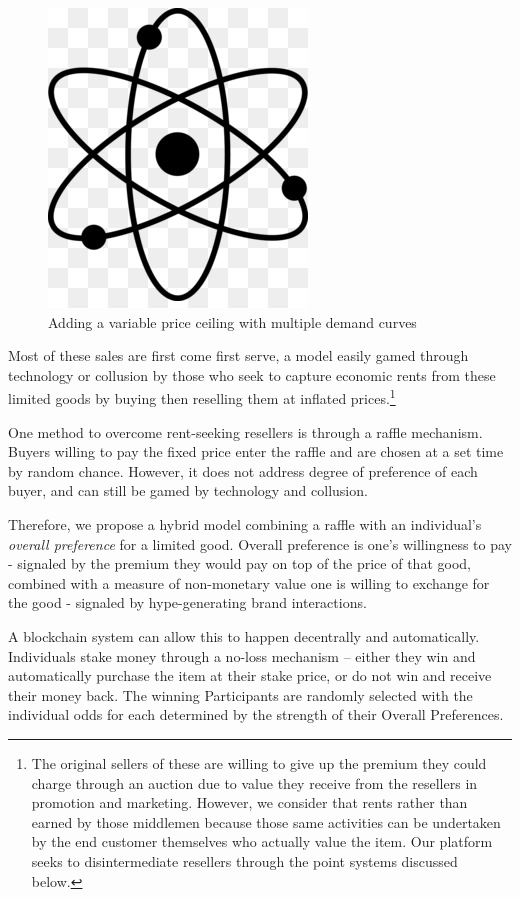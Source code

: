 \documentclass[runningheads]{llncs}
\begin{document}
\begin{figure}[H]
\centering
\includegraphics[scale=0.5]{Figures_and_Tables/atom.png}
\caption{Adding a variable price ceiling with multiple demand curves}
\end{figure}


Most of these sales are first come first serve, a model easily gamed through technology or collusion by those who seek to capture economic rents from these limited goods by buying then reselling them at inflated prices.\footnote{The original sellers of these are willing to give up the premium they could charge through an auction due to value they receive from the resellers in promotion and marketing.  However, we consider that rents rather than earned by those middlemen because those same activities can be undertaken by the end customer themselves who actually value the item.  Our platform seeks to disintermediate resellers through the point systems discussed below.}

One method to overcome rent-seeking resellers is through a raffle mechanism.  Buyers willing to pay the fixed price enter the raffle and are chosen at a set time by random chance.  However, it does not address degree of preference of each buyer, and can still be gamed by technology and collusion.

Therefore, we propose a hybrid model combining a raffle with an individual’s \emph{overall preference} for a limited good.  Overall preference is one’s willingness to pay - signaled by the premium they would pay on top of the price of that good, combined with a measure of non-monetary value one is willing to exchange for the good - signaled by hype-generating brand interactions.

A blockchain system can allow this to happen decentrally and automatically.   
Individuals stake money through a no-loss mechanism – either they win and automatically purchase the item at their stake price, or do not win and receive their money back.  The winning Participants are randomly selected with the individual odds for each determined by the strength of their Overall Preferences.
\end{document}
